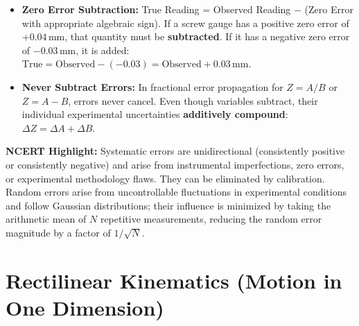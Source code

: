 \documentclass[10pt,a4paper]{article}
\begin{document}
\begin{trapbox}
\begin{itemize}
  \item \textbf{Zero Error Subtraction:} True Reading = Observed Reading $-$ (Zero Error with appropriate algebraic sign). If a screw gauge has a positive zero error of $+0.04\,\mathrm{mm}$, that quantity must be \textbf{subtracted}. If it has a negative zero error of $-0.03\,\mathrm{mm}$, it is added: $\text{True} = \text{Observed} - (-0.03) = \text{Observed} + 0.03\,\mathrm{mm}$.
  \item \textbf{Never Subtract Errors:} In fractional error propagation for $Z = A/B$ or $Z = A - B$, errors never cancel. Even though variables subtract, their individual experimental uncertainties \textbf{additively compound}: $\Delta Z = \Delta A + \Delta B$.
\end{itemize}
\end{trapbox}

\begin{ncertbox}
\textbf{NCERT Highlight:} Systematic errors are unidirectional (consistently positive or consistently negative) and arise from instrumental imperfections, zero errors, or experimental methodology flaws. They can be eliminated by calibration. Random errors arise from uncontrollable fluctuations in experimental conditions and follow Gaussian distributions; their influence is minimized by taking the arithmetic mean of $N$ repetitive measurements, reducing the random error magnitude by a factor of $1/\sqrt{N}$.
\end{ncertbox}

\section{Rectilinear Kinematics (Motion in One Dimension)}
\end{document}
